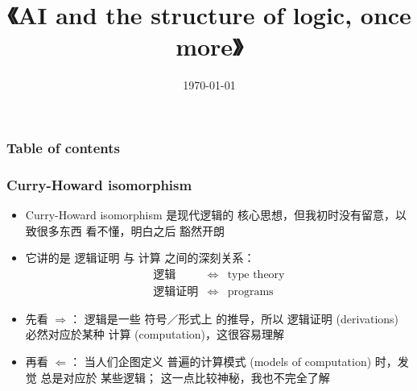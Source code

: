 \documentclass[16pt]{beamer}
\title[Structure of logic once more]{\cc{再谈一次 AI 的逻辑结构}
{\Huge《AI and the structure of logic, once more》}}
\author{\cc{YKY 甄景贤}{YKY}} %
\date{\today} %
\makeatletter
\newcommand{\emp}[1]{{\color{violet}#1}}
\newcommand{\smiley}{$\vcenter{\hbox{\texttt{[image: ../smiling-face.png]}}}$}
\newif\ifframeinlbf
\newcommand\listofframes{\@starttoc{lbf}}
\makeatother
\begin{document}
\frameinlbffalse
\addtocounter{page}{-1}
\begin{frame}
\titlepage
\end{frame}

\addtocounter{page}{-1}
\begin{frame}[noframenumbering]
\frametitle{Table of contents}
\listofframes
\end{frame}



\frameinlbftrue

%	

\begin{frame}
\frametitle{Curry-Howard isomorphism}
\begin{itemize}
	\item Curry-Howard isomorphism 是现代逻辑的 核心思想，但我初时没有留意，以致很多东西 看不懂，明白之后 豁然开朗
	
	\item 它讲的是 \emp{逻辑证明} 与 \emp{计算} 之间的深刻关系：
	\begin{eqnarray}
	\mbox{逻辑} & \Leftrightarrow & \mbox{type theory} \\
	\mbox{逻辑证明} & \Leftrightarrow & \mbox{programs} \nonumber
	\end{eqnarray}
	
	\item 先看 $\Rightarrow$： 逻辑是一些 符号／形式上 的推导，所以 逻辑证明 (derivations) 必然对应於某种 计算 (computation)，这很容易理解
	
	\item 再看 $\Leftarrow$： 当人们企图定义 普遍的计算模式 (models of computation) 时，发觉 总是对应於 某些逻辑； 这一点比较神秘，我也不完全了解
\end{itemize}
\end{frame}
\end{document}
